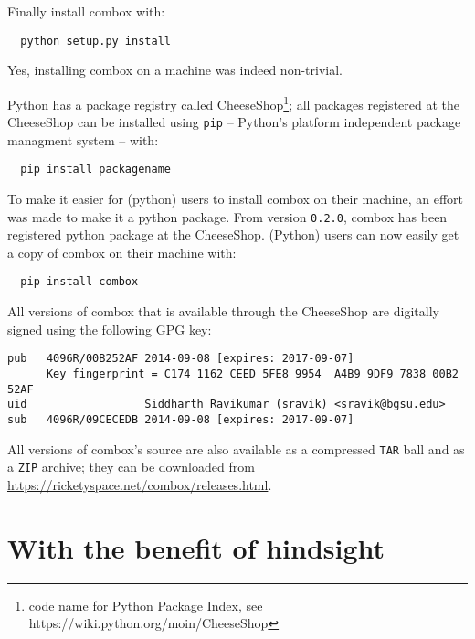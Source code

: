 Finally install combox with:

\begin{verbatim}
  python setup.py install
\end{verbatim}

Yes, installing combox on a machine was indeed non-trivial.

Python has a package registry called CheeseShop\footnote{code name for
  Python Package Index, see https://wiki.python.org/moin/CheeseShop};
all packages registered at the CheeseShop can be installed using
\verb+pip+ -- Python's platform independent package managment
system\cite{py:pip} -- with:

\begin{verbatim}
  pip install packagename
\end{verbatim}

To make it easier for (python) users to install combox on their
machine, an effort was made to make it a python
package\cite{py:package-guide}. From version \verb+0.2.0+, combox has
been registered python package at the CheeseShop. (Python) users can
now easily get a copy of combox on their machine with:

\begin{verbatim}
  pip install combox
\end{verbatim}

All versions of combox that is available through the CheeseShop are
digitally signed using the following GPG key:

\begin{verbatim}
pub   4096R/00B252AF 2014-09-08 [expires: 2017-09-07]
      Key fingerprint = C174 1162 CEED 5FE8 9954  A4B9 9DF9 7838 00B2 52AF
uid                  Siddharth Ravikumar (sravik) <sravik@bgsu.edu>
sub   4096R/09CECEDB 2014-09-08 [expires: 2017-09-07]
\end{verbatim}

All versions of combox's source are also available as a compressed
\verb+TAR+ ball and as a \verb+ZIP+ archive; they can be downloaded
from \url{https://ricketyspace.net/combox/releases.html}.

\section{With the benefit of hindsight}\label{4-hindsight}

